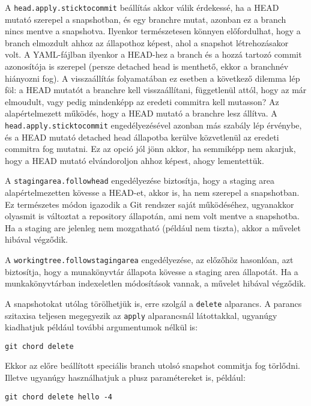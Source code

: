 \documentclass[final]{elteikthesis}[2025/03/25]
\begin{document}
A \verb|head.apply.sticktocommit| beállítás akkor válik érdekessé,
ha a HEAD mutató szerepel a snapshotban, és egy branchre mutat,
azonban ez a branch nincs mentve a snapshotva.
Ilyenkor természetesen könnyen előfordulhat, hogy a branch elmozdult ahhoz az állapothoz képest,
ahol a snapshot létrehozásakor volt.
A YAML-fájlban ilyenkor a HEAD-hez a branch és a hozzá tartozó commit azonosítója is szerepel
(persze detached head is menthető, ekkor a branchnév hiányozni fog).
A visszaállítás folyamatában ez esetben a következő dilemma lép föl:
a HEAD mutatót a branchre kell visszaállítani, függetlenül attól, hogy az már elmoudult,
vagy pedig mindenképp az eredeti commitra kell mutasson?
Az alapértelmezett működés, hogy a HEAD mutató a branchre lesz állítva.
A \verb|head.apply.sticktocommit| engedélyezésével azonban más szabály lép érvénybe,
és a HEAD mutató detached head állapotba kerülve közvetlenül az eredeti commitra fog mutatni.
Ez az opció jól jönn akkor, ha semmiképp nem akarjuk,
hogy a HEAD mutató elvándoroljon ahhoz képest, ahogy lementettük.

A \verb|stagingarea.followhead| engedélyezése biztosítja,
hogy a staging area alapértelmezetten kövesse a HEAD-et, akkor is, ha nem szerepel a snapshotban.
Ez természetes módon igazodik a Git rendszer saját működéséhez,
ugyanakkor olyasmit is változtat a repository állapotán, ami nem volt mentve a snapshotba.
Ha a staging are jelenleg nem mozgatható (például nem tiszta),
akkor a művelet hibával végződik.

A \verb|workingtree.followstagingarea| engedélyezése, az előzőhöz hasonlóan,
azt biztosítja, hogy a munakönyvtár állapota kövesse a staging area állapotát.
Ha a munkakönyvtárban indexeletlen módosítások vannak,
a művelet hibával végződik.

A snapshotokat utólag törölhetjük is, erre szolgál a \verb|delete| alparancs.
A parancs szitaxisa teljesen megegyezik az \verb|apply| alparancsnál látottakkal,
ugyanúgy kiadhatjuk például további argumentumok nélkül is:

\begin{verbatim}
git chord delete
\end{verbatim}

Ekkor az előre beállított speciális branch utolsó snapshot commitja fog törlődni.
Illetve ugyanúgy használhatjuk a plusz paramétereket is, például:

\begin{verbatim}
git chord delete hello -4
\end{verbatim}
\end{document}
